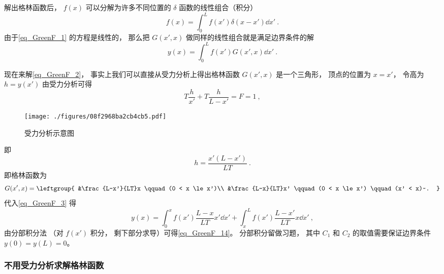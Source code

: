 解出格林函数后， $f(x)$ 可以分解为许多不同位置的 $\delta$ 函数的线性组合（积分）
\begin{equation}
f(x) = \int_0^L f(x') \delta(x - x') \dd{x'}~.
\end{equation}
由于\autoref{eq_GreenF_1} 的方程是线性的， 那么把 $G(x', x)$ 做同样的线性组合就是满足边界条件的解
\begin{equation}\label{eq_GreenF_3}
y(x) = \int_0^L f(x') G(x', x) \dd{x'}~.
\end{equation}

现在来解\autoref{eq_GreenF_2}， 事实上我们可以直接从受力分析上得出格林函数 $G(x', x)$ 是一个三角形， 顶点的位置为 $x = x'$， 令高为 $h = y(x')$ 由受力分析可得
\begin{equation}
T\frac{h}{x'} + T\frac{h}{L - x'} = F = 1~,
\end{equation}
\begin{figure}[ht]
\centering
\texttt{[image: ./figures/08f2968ba2cb4cb5.pdf]}
\caption{受力分析示意图} \label{fig_GreenF_1}
\end{figure}
即
\begin{equation}\label{eq_GreenF_11}
h = \frac{x' (L - x')}{LT}~.
\end{equation}
即格林函数为
\begin{equation}
G(x', x) = \leftgroup{
&\frac{L-x'}{LT}x \qquad (0 < x \le x')\\
&\frac{L-x}{LT}x' \qquad (0 < x \le x') \qquad (x' < x)~.
}\end{equation}
代入\autoref{eq_GreenF_3} 得
\begin{equation}\label{eq_GreenF_12}
y(x) = \int_0^x f(x') \frac{L-x}{LT}x'\dd{x'} + \int_x^L f(x')\frac{L-x'}{LT}x \dd{x'}~,
\end{equation}
由分部积分法 （对 $f(x')$ 积分， 剩下部分求导）可得\autoref{eq_GreenF_14}。 分部积分留做习题， 其中 $C_1$ 和 $C_2$ 的取值需要保证边界条件 $y(0) = y(L) = 0$。

\subsubsection{不用受力分析求解格林函数}

